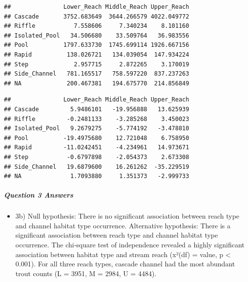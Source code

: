 \documentclass[
]{article}
\newenvironment{Shaded}{\begin{snugshade}}{\end{snugshade}}
\newcommand{\CommentTok}[1]{\textcolor[rgb]{0.56,0.35,0.01}{\textit{#1}}}
\newcommand{\FunctionTok}[1]{\textcolor[rgb]{0.13,0.29,0.53}{\textbf{#1}}}
\newcommand{\NormalTok}[1]{#1}
\newcommand{\SpecialCharTok}[1]{\textcolor[rgb]{0.81,0.36,0.00}{\textbf{#1}}}
\providecommand{\tightlist}{%
  \setlength{\itemsep}{0pt}\setlength{\parskip}{0pt}}
\begin{document}
\begin{Shaded}
\end{Shaded}

\begin{verbatim}
##               Lower_Reach Middle_Reach Upper_Reach
## Cascade       3752.683649  3644.266579 4022.049772
## Riffle           7.558606     7.340234    8.101160
## Isolated_Pool   34.506680    33.509764   36.983556
## Pool          1797.633730  1745.699114 1926.667156
## Rapid          138.026721   134.039054  147.934224
## Step             2.957715     2.872265    3.170019
## Side_Channel   781.165517   758.597220  837.237263
## NA             200.467381   194.675770  214.856849
\end{verbatim}

\begin{Shaded}
\end{Shaded}

\begin{verbatim}
##               Lower_Reach Middle_Reach Upper_Reach
## Cascade         5.9486101   -19.956888   13.625939
## Riffle         -0.2481133    -3.285268    3.450023
## Isolated_Pool   9.2679275    -5.774192   -3.478810
## Pool          -19.4975680    12.721048    6.758950
## Rapid         -11.0242451    -4.234961   14.973671
## Step           -0.6797898    -2.054373    2.673308
## Side_Channel   19.6879600    16.261262  -35.229519
## NA              1.7093880     1.351373   -2.999733
\end{verbatim}

\subparagraph{Question 3 Answers}\label{question-3-answers}

\begin{itemize}
\tightlist
\item
  3b) Null hypothesis: There is no significant association between reach
  type and channel habitat type occurrence. Alternative hypothesis:
  There is a significant association between reach type and channel
  habitat type occurrence. The chi‑square test of independence revealed
  a highly significant association between habitat type and stream reach
  (x²(df) = value, p \textless{} 0.001). For all three reach types,
  cascade channel had the most abundant trout counts (L = 3951, M =
  2984, U = 4484).
\end{itemize}
\end{document}
